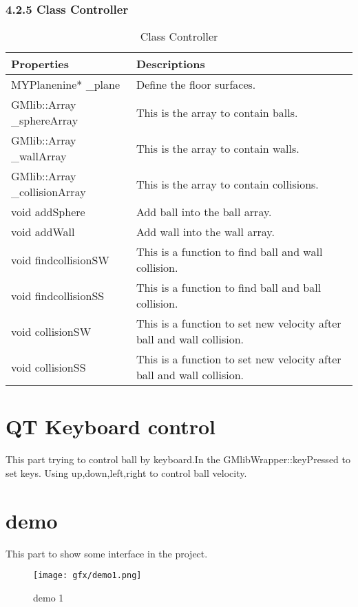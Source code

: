 \documentclass[a4,10pt]{article}
\begin{document}
\subsubsection*{4.2.5 Class Controller}
\begin{table}[H]
\centering
\caption{ Class Controller}
\label{my-label}
\begin{tabular}{|l|l|}
\hline
\textbf{Properties}           & \textbf{Descriptions}                                                 \\ \hline
MYPlanenine* \_plane          & Define the floor surfaces.                                            \\ \hline
GMlib::Array \_sphereArray    & This is the array to contain balls.                                   \\ \hline
GMlib::Array \_wallArray      & This is the array to contain walls.                                   \\ \hline
GMlib::Array \_collisionArray & This is the array to contain collisions.                              \\ \hline
void addSphere                & Add ball into the ball array.                                         \\ \hline
void addWall                  & Add wall into the wall array.                                         \\ \hline
void findcollisionSW          & This is a function to find ball and wall collision.                   \\ \hline
void findcollisionSS          & This is a function to find ball and ball collision.                   \\ \hline
void collisionSW              & This is a function to set new velocity after ball and wall collision. \\ \hline
void collisionSS              & This is a function to set new velocity after ball and wall collision. \\ \hline
\end{tabular}
\end{table}

  \section{QT Keyboard control}
This part trying to control ball by keyboard.In the GMlibWrapper::keyPressed to set keys.
Using up,down,left,right to control ball velocity.

 \section{demo}
This part to show some interface in the project.
    \begin{figure}[H]
      \centering
      \texttt{[image: gfx/demo1.png]}
      \caption{demo 1}
      \label{fig:fi}
    \end{figure}
\end{document}
